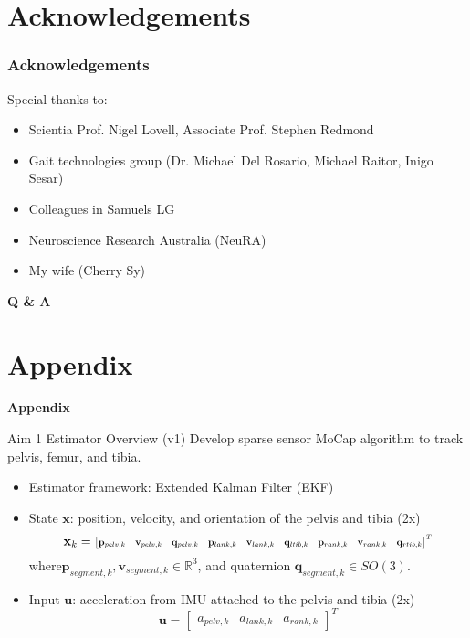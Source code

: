 \documentclass[aspectratio=169]{beamer}
\newcommand\scalemath[2]{\scalebox{#1}{\mbox{\ensuremath{\displaystyle #2}}}}
\newcommand{\R}{\mathbb{R}}
\renewcommand{\vec}{\mathbf}
\begin{document}
	\section{Acknowledgements}
	\begin{frame}
		\frametitle{Acknowledgements}
		Special thanks to:
		\begin{itemize}
			\item Scientia Prof. Nigel Lovell, Associate Prof. Stephen Redmond
			\item Gait technologies group (Dr. Michael Del Rosario, Michael Raitor, Inigo Sesar)
			\item Colleagues in Samuels LG
			\item Neuroscience Research Australia (NeuRA)
		    \item My wife (Cherry Sy)
		\end{itemize}
	\end{frame}
	
	\begin{frame}{}
	    \begin{center}
	    \textbf{Q \& A}
	    \end{center}
	\end{frame}

    \section{Appendix}
        \begin{frame}{}
            \textbf{Appendix}
        \end{frame}
        
    	\begin{frame}{Aim 1 Estimator Overview (v1)}
    		Develop sparse sensor MoCap algorithm to track pelvis, femur, and tibia.
    		
    		\begin{itemize}
    			\item Estimator framework: Extended Kalman Filter (EKF)
    			\item State $\vec{x}$: position, velocity, and orientation of the pelvis and tibia (2x) 
    			    \[ 
    			        \vec{x}_{k} = \scalemath{0.75}{
        			        \begin{bmatrix}
        			            \vec{p}_{pelv, k} & \vec{v}_{pelv, k} & \vec{q}_{pelv, k} & 
        			            \vec{p}_{lank, k} & \vec{v}_{lank, k} & \vec{q}_{ltib, k} & 
        			            \vec{p}_{rank, k} & \vec{v}_{rank, k} & \vec{q}_{rtib, k}
    			            \end{bmatrix}^T }
		            \] where$\vec{p}_{segment, k}, \vec{v}_{segment, k} \in \R^3$, and quaternion $\vec{q}_{segment, k} \in SO(3)$.

    			\item Input $\vec{u}$: acceleration from IMU attached to the pelvis and tibia (2x)
    			    \[ 
    			        \vec{u} = \begin{bmatrix}
    			                a_{pelv, k} & a_{lank, k} & a_{rank, k}
    			            \end{bmatrix}^T
			        \]
	        \end{itemize}
        \end{frame}
        
\end{document}

